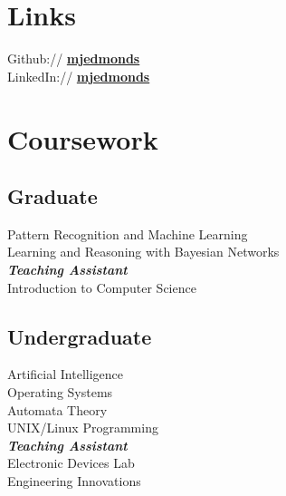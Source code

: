 \documentclass[letterpaper]{deedy-resume} %
\begin{document}
\begin{minipage}[t]{0.32\textwidth}
\sectionspace %


\section{Links} 

Github:// \href{https://github.com/mjedmonds}{\bf mjedmonds} \\
LinkedIn:// \href{https://www.linkedin.com/in/mjedmonds}{\bf mjedmonds} \\

\sectionspace %


\section{Coursework}

\subsection{Graduate}

Pattern Recognition and Machine Learning\\
Learning and Reasoning with Bayesian Networks\\
{\footnotesize \textit{\textbf{Teaching Assistant}}} \\
Introduction to Computer Science

\sectionspace %


\subsection{Undergraduate}

Artificial Intelligence \\
Operating Systems \\
Automata Theory\\
UNIX/Linux Programming \\
{\footnotesize \textit{\textbf{Teaching Assistant}}} \\
Electronic Devices Lab\\
Engineering Innovations


\end{minipage}
\end{document}
